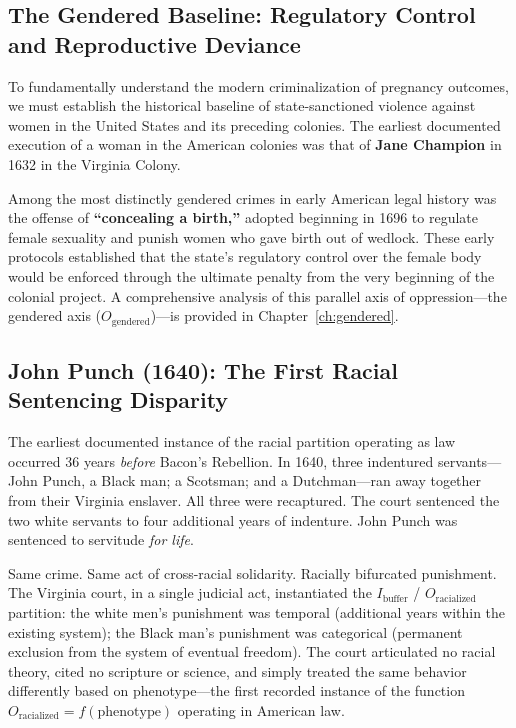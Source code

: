\subsection{The Gendered Baseline: Regulatory Control and Reproductive Deviance}

To fundamentally understand the modern criminalization of pregnancy outcomes, we must establish the historical baseline of state-sanctioned violence against women in the United States and its preceding colonies. The earliest documented execution of a woman in the American colonies was that of \textbf{Jane Champion} in 1632 in the Virginia Colony. 

Among the most distinctly gendered crimes in early American legal history was the offense of \textbf{``concealing a birth,''} adopted beginning in 1696 to regulate female sexuality and punish women who gave birth out of wedlock. These early protocols established that the state's regulatory control over the female body would be enforced through the ultimate penalty from the very beginning of the colonial project. A comprehensive analysis of this parallel axis of oppression---the gendered axis ($O_{\text{gendered}}$)---is provided in Chapter~\ref{ch:gendered}.

\subsection{John Punch (1640): The First Racial Sentencing Disparity}

The earliest documented instance of the racial partition operating as law occurred 36 years \textit{before} Bacon's Rebellion. In 1640, three indentured servants---John Punch, a Black man; a Scotsman; and a Dutchman---ran away together from their Virginia enslaver. All three were recaptured. The court sentenced the two white servants to four additional years of indenture. John Punch was sentenced to servitude \textit{for life}.

Same crime. Same act of cross-racial solidarity. Racially bifurcated punishment. The Virginia court, in a single judicial act, instantiated the $I_{\text{buffer}}$ / $O_{\text{racialized}}$ partition: the white men's punishment was temporal (additional years within the existing system); the Black man's punishment was categorical (permanent exclusion from the system of eventual freedom). The court articulated no racial theory, cited no scripture or science, and simply treated the same behavior differently based on phenotype---the first recorded instance of the function $O_{\text{racialized}} = f(\text{phenotype})$ operating in American law.

